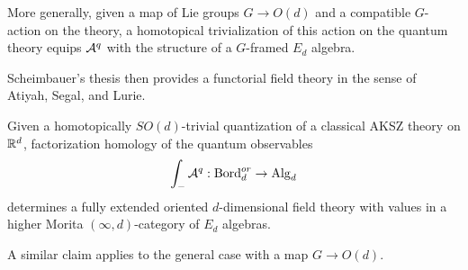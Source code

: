 \documentclass[11pt]{amsart}
\begin{document}
More generally, given a map of Lie groups $G \to O(d)$ and a compatible $G$-action on the theory, a homotopical trivialization of this action on the quantum theory equips $\mathcal A^q$ with the structure of a $G$-framed $E_d$ algebra.

Scheimbauer's thesis then provides a functorial field theory in the sense of Atiyah, Segal, and Lurie.

\begin{thm}
Given a homotopically $SO(d)$-trivial quantization of a classical AKSZ theory on $\mathbb R^d$, 
factorization homology of the quantum observables 
\[
\int_{-} \mathcal A^q : {\rm Bord}^{or}_d \to {\rm Alg}_d
\]
determines a fully extended oriented $d$-dimensional field theory with values in a higher Morita $(\infty,d)$-category of $E_d$ algebras.
\end{thm}

A similar claim applies to the general case with a map $G \to O(d)$.
\end{document}
